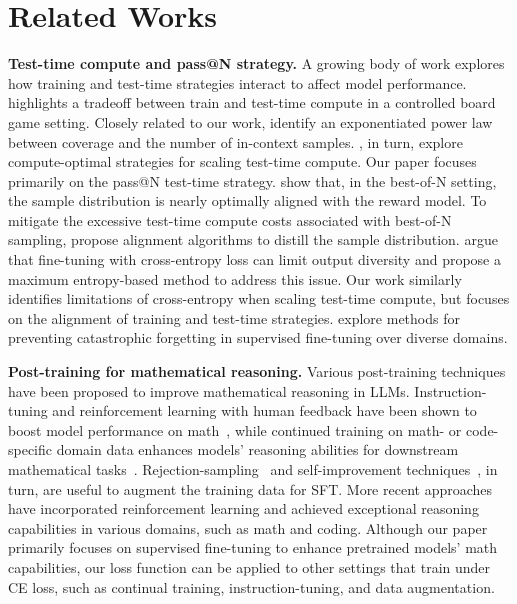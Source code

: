 \section{Related Works}
\label{sec:relatedworks}

%
%

%

\textbf{Test-time compute and pass@N strategy.} 
%
%
%
A growing body of work explores how training and test-time strategies interact to affect model performance.
\citet{boardgamescaling} highlights a tradeoff between train and test-time compute in a controlled board game setting.
%
Closely related to our work, \citet{largelanguagemonkey} identify an exponentiated power law between coverage and the number of in-context samples. \citet{scalingtestimecompute}, in turn, explore compute-optimal strategies for scaling test-time compute. Our paper focuses primarily on the pass@N test-time strategy.
\citet{gui2024bonbonalignmentlargelanguage} show that, in the best-of-N setting, the sample distribution is nearly optimally aligned with the reward model. To mitigate the excessive test-time compute costs associated with best-of-N sampling, \citet{gui2024bonbonalignmentlargelanguage, sessa2024bondaligningllmsbestofn} propose alignment algorithms to distill the sample distribution. \citet{li2024entropicdistributionmatchingsupervised} argue that fine-tuning with cross-entropy loss can limit output diversity and propose a maximum entropy-based method to address this issue. Our work similarly identifies limitations of cross-entropy when scaling test-time compute, but focuses on the alignment of training and test-time strategies. \citet{zhang2024balancing} explore methods for preventing catastrophic forgetting in supervised fine-tuning over diverse domains. 

%
\textbf{Post-training for mathematical reasoning.}
Various post-training techniques have been proposed to improve mathematical reasoning in LLMs. Instruction-tuning and reinforcement learning with human feedback have been shown to boost model performance on math~\cite{mathinstruct,prm8k,ormprm}, while continued training on math- or code-specific domain data enhances models' reasoning abilities for downstream mathematical tasks~\cite{minerva,azerbayev2024llemma,QwenMath2.5,deepseekmath,internlmmath}.
%
%
%
Rejection-sampling~\cite{star} and self-improvement techniques~\cite{rstar}, in turn, are useful to augment the training data for SFT.
%
More recent approaches~\cite{openaio1, deepseekr1} have incorporated reinforcement learning and achieved exceptional reasoning capabilities in various domains, such as math and coding.
%
Although our paper primarily focuses on supervised fine-tuning to enhance pretrained models' math capabilities, our loss function can be applied to other settings that train under CE loss, such as continual training, instruction-tuning, and data augmentation.
%
%
%
%
%
%
%
%
%
%
%
%


